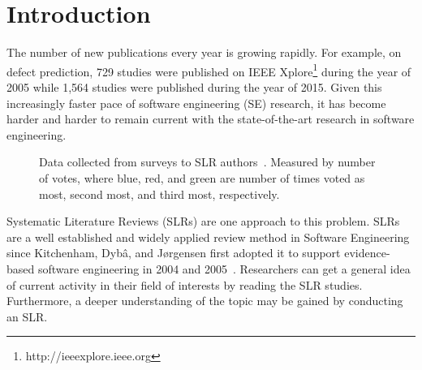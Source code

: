 \documentclass[final,twocolumn,5p]{elsarticle}
\theoremstyle{break}
\begin{document}
\section{Introduction}
\label{sect: Introduction}

 The
number of new publications every year is growing rapidly. For example, on defect
prediction, 729 studies were published on IEEE
Xplore\footnote{http://ieeexplore.ieee.org} during the year of 2005 while 1,564
studies were published during the year of 2015.
Given this increasingly faster pace of software engineering (SE) research,
it has become harder and harder to remain current with
the state-of-the-art research in software engineering.


\begin{figure}[ht]
    \centering
    \caption{Data collected from surveys to SLR authors~\cite{carver2013identifying}. Measured by number of votes, where blue, red, and green are number of times voted as most, second most, and third most, respectively.}
    \label{fig:barrier}
\end{figure}
Systematic Literature Reviews
(SLRs) are one approach to this problem. SLRs are a well established and widely
applied review method in Software Engineering since Kitchenham, Dyb{\^{a}}, and
J{\o}rgensen first adopted it to support evidence-based software engineering in
2004 and 2005~\cite{kitchenham2004evidence,1377125}. 
Researchers can get a
general idea of current activity in their field of interests by reading the SLR
studies. Furthermore, a
deeper understanding of the topic may be gained by conducting an SLR.
\end{document}
